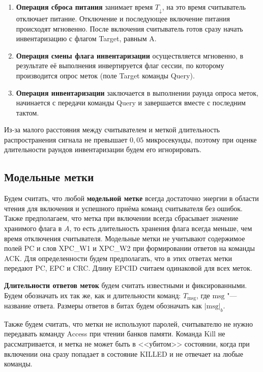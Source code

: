 \begin{enumerate}
	\item \textbf{Операция сброса питания} занимает время $T_\downarrow$, на это время считыватель отключает питание. Отключение и последующее включение питания происходят мгновенно. После включения считыватель готов сразу начать инвентаризацию с флагом Target, равным A.

	\item \textbf{Операция смены флага инвентаризации} осуществляется мгновенно, в результате её выполнения инвертируется флаг сессии, по которому производится опрос меток (поле Target команды Query).

	\item \textbf{Операция инвентаризации} заключается в выполнении раунда опроса меток, начинается с передачи команды Query и завершается вместе с последним тактом.
\end{enumerate}

Из-за малого расстояния между считывателем и меткой длительность распространения сигнала не превышает $0,05$ микросекунды, поэтому при оценке длительности раундов инвентаризации будем его игнорировать.


\subsection{Модельные метки}
Будем считать, что любой \textbf{модельной метке} всегда достаточно энергии в области чтения для включения и успешного приёма команд считывателя без ошибок. Также предполагаем, что метка при включении всегда сбрасывает значение хранимого флага в $A$, то есть длительность хранения флага всегда меньше, чем время отключения считывателя. Модельные метки не учитывают содержимое полей PC и слов XPC\_W1 и XPC\_W2 при формировании ответов на команды ACK. Для определенности будем предполагать, что в этих ответах метки передают PC, EPC и CRC. Длину EPCID считаем одинаковой для всех меток.

\textbf{Длительности ответов меток} будем считать известными и фиксированными. Будем обозначать их так же, как и длительности команд: $T_\text{msg}$, где $\text{msg}$ "--- название ответа. Размеры ответов в битах будем обозначать как $|\text{msg}|_b$.

Также будем считать, что метки не используют паролей, считывателю не нужно передавать команду Access при чтении банков памяти. Команда Kill не рассматривается, и метка не может быть в <<убитом>> состоянии, когда при включении она сразу попадает в состояние KILLED и не отвечает на любые команды.




